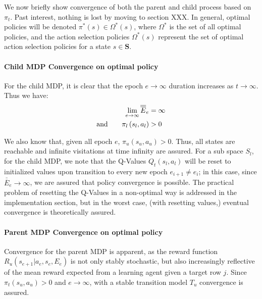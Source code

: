 \documentclass[compsoc,journal,letterpaper,10pt,draftcls,twocolumn]{IEEEtran}
\begin{document}
We now briefly show convergence of both the parent and child process
based on \(\pi_{t}\). Past interest, nothing is lost by moving to
section XXX. In general, optimal policies will be denoted
\(\pi^{*}(s) \in \Omega^{*}(s)\), where \(\Omega^{*}\) is the set of all
optimal policies, and the action selection policies \(\Omega^{*}(s)\)
represent the set of optimal action selection policies for a state
\(s \in \mathbf{S}\).

\paragraph{Child MDP Convergence on optimal
policy}\label{child-mdp-convergence-on-optimal-policy}

For the child MDP, it is clear that the epoch \(e \rightarrow \infty\)
duration increases as \(t \rightarrow \infty\). Thus we have:
\begin{align}
\lim_{e\rightarrow\infty}
\overline{\overline{E}}_{e} &= \infty \notag\\ 
\textrm{and}\qquad
\pi_{l}\left( s_{l}, a_{l} \right) &> 0
\end{align} 

We also know that, given all epoch \(e\),
\(\pi_{u}\left( s_{u},a_{u} \right) > 0\). Thus, all states are
reachable and infinite visitations at time infinity are assured. For a
sub space \(S_{l}\), for the child MDP, we note that the Q-Values
\(Q_{t}(s_{l},a_{l})\) will be reset to initialized values upon
transition to every new epoch \(e_{i + 1} \neq e_{i}\); in this case,
since \(\overline{\overline E}_{e} \rightarrow \infty\), we are assured that
policy convergence is possible. The practical problem of resetting the
Q-Values in a non-optimal way is addressed in the implementation
section, but in the worst case, (with resetting values,) eventual
convergence is theoretically assured.

\paragraph{Parent MDP Convergence on optimal
policy}\label{parent-mdp-convergence-on-optimal-policy}

Convergence for the parent MDP is apparent, as the reward function
\(R_{u}\left( s_{e + 1}|a_{e},s_{e},E_{e} \right)\) is not only stably
stochastic, but also increasingly reflective of the mean reward expected
from a learning agent given a target row \(j\). Since
\(\pi_{t}\left( s_{u},a_{u} \right) > 0\) and \(e \rightarrow \infty\),
with a stable transition model \(T_{u}\) convergence is assured.
\end{document}

